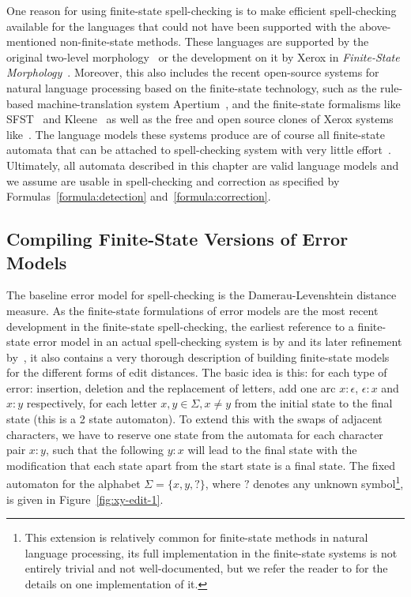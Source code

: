 \documentclass[a4paper,12pt]{article}
\begin{document}
One reason for using finite-state spell-checking is to make efficient
spell-checking available for the languages that could not have been supported
with the above-mentioned non-finite-state methods. These languages are
supported by the original two-level morphology~\cite[]{koskenniemi/1983} or the
development on it by Xerox in \emph{Finite-State
Morphology}~\cite[]{beesley2003finite}.  Moreover, this also includes the
recent open-source systems for natural language processing based on the
finite-state technology, such as the rule-based machine-translation system
Apertium~\cite[]{apertium2010}, and the finite-state formalisms like
SFST~\cite[]{schmid2006programming} and Kleene~\cite[]{beesley2012kleene} as
well as the free and open source clones of Xerox systems
like~\cite{hfst/2012/cla,hulden2009foma}.  The language models these systems
produce are of course all finite-state automata that can be attached to
spell-checking system with very little
effort~\cite[e.g.][]{pirinen2012compiling}. Ultimately, all automata described
in this chapter are valid language models and we assume are usable in
spell-checking and correction as specified by Formulas~\ref{formula:detection}
and~\ref{formula:correction}.

\subsection{Compiling Finite-State Versions of Error Models}
\label{subsec:error-models}

The baseline error model for spell-checking is the Damerau-Levenshtein distance
measure. As the finite-state formulations of error models are the most recent
development in the finite-state spell-checking, the earliest reference to a
finite-state error model in an actual spell-checking system is by
\cite{schulz/2002} and its later refinement by~\cite{mihov2004fast}, it also
contains a very thorough description of building finite-state models for the
different forms of edit distances. The basic idea is this: for each type of
error: insertion, deletion and the replacement of letters, add one arc
$x:\epsilon$, $\epsilon:x$ and $x:y$ respectively, for each letter $x, y \in
\Sigma, x \neq y$ from the initial state to the final state (this is a 2 state
automaton). To extend this with the swaps of adjacent characters, we have to
reserve one state from the automata for each character pair $x:y$, such that
the following $y:x$ will lead to the final state \cite[]{pirinen/2010/lrec}
with the modification that each state apart from the start state is a final
state.  The fixed automaton for the alphabet $\Sigma = \{x, y, ?\}$, where $?$
denotes any unknown symbol\footnote{This extension is relatively common for
    finite-state methods in natural language processing, its full
    implementation in the finite-state systems is not entirely trivial and not
    well-documented, but we refer the reader to \cite[]{beesley2003finite} for
the details on one implementation of it.}, is given in
Figure~\ref{fig:xy-edit-1}.
\end{document}

